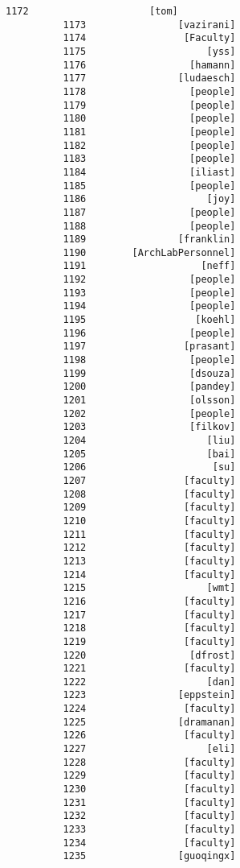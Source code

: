 \documentclass[11pt]{article}
\begin{document}
\begin{Verbatim}[commandchars=\\\{\}]
          1172                     [tom]
          1173                [vazirani]
          1174                 [Faculty]
          1175                     [yss]
          1176                  [hamann]
          1177                [ludaesch]
          1178                  [people]
          1179                  [people]
          1180                  [people]
          1181                  [people]
          1182                  [people]
          1183                  [people]
          1184                  [iliast]
          1185                  [people]
          1186                     [joy]
          1187                  [people]
          1188                  [people]
          1189                [franklin]
          1190        [ArchLabPersonnel]
          1191                    [neff]
          1192                  [people]
          1193                  [people]
          1194                  [people]
          1195                   [koehl]
          1196                  [people]
          1197                 [prasant]
          1198                  [people]
          1199                  [dsouza]
          1200                  [pandey]
          1201                  [olsson]
          1202                  [people]
          1203                  [filkov]
          1204                     [liu]
          1205                     [bai]
          1206                      [su]
          1207                 [faculty]
          1208                 [faculty]
          1209                 [faculty]
          1210                 [faculty]
          1211                 [faculty]
          1212                 [faculty]
          1213                 [faculty]
          1214                 [faculty]
          1215                     [wmt]
          1216                 [faculty]
          1217                 [faculty]
          1218                 [faculty]
          1219                 [faculty]
          1220                  [dfrost]
          1221                 [faculty]
          1222                     [dan]
          1223                [eppstein]
          1224                 [faculty]
          1225                [dramanan]
          1226                 [faculty]
          1227                     [eli]
          1228                 [faculty]
          1229                 [faculty]
          1230                 [faculty]
          1231                 [faculty]
          1232                 [faculty]
          1233                 [faculty]
          1234                 [faculty]
          1235                [guoqingx]

\end{Verbatim}
\end{document}
